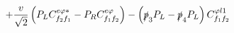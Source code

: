 %
\begin{dmath*}
%
  +  \frac{v}{\sqrt{2}} \left(P_L C^{e \varphi  *}_{f_2 f_1} - P_R C^{e \varphi  }_{f_1 f_2}\right)  -  \left(\slashed{p}_{3} P_L - \slashed{p}_{4} P_L\right) C^{ \varphi  l1}_{f_1 f_2}
%
\end{dmath*}
%
